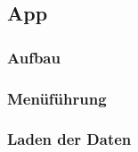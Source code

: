 \subsection{App}
\subsubsection{Aufbau}

\subsubsection{Menüführung}

\subsubsection{Laden der Daten}
